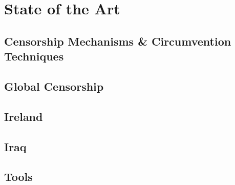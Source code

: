 \chapter{State of the Art}
\section{Censorship Mechanisms \& Circumvention Techniques}

\section{Global Censorship}

\section{Ireland}

\section{Iraq}

\section{Tools}
